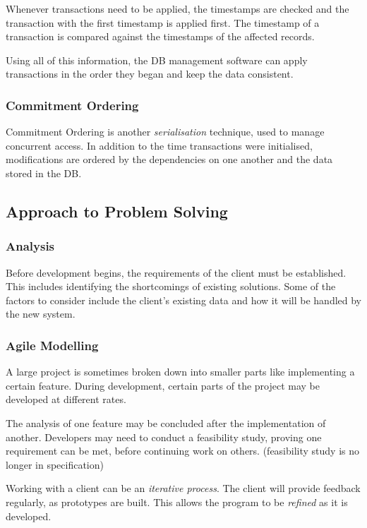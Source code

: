 \documentclass[9pt]{article}
\begin{document}
Whenever transactions need to be applied, the timestamps are checked and the transaction with the first timestamp is applied first. The timestamp of a transaction is compared against the timestamps of the affected records.

Using all of this information, the DB management software can apply transactions in the order they began and keep the data consistent.

\subsubsection{Commitment Ordering}
\label{sec:org93e1788}

Commitment Ordering is another \emph{serialisation} technique, used to manage concurrent access. In addition to the time transactions were initialised, modifications are ordered by the dependencies on one another and the data stored in the DB.

\subsection{Approach to Problem Solving}
\label{sec:org94f5f0a}
\subsubsection{Analysis}
\label{sec:org668d719}

Before development begins, the requirements of the client must be established. This includes identifying the shortcomings of existing solutions. Some of the factors to consider include the client's existing data and how it will be handled by the new system.

\subsubsection{Agile Modelling}
\label{sec:org2573260}

A large project is sometimes broken down into smaller parts like implementing a certain feature. During development, certain parts of the project may be developed at different rates.

The analysis of one feature may be concluded after the implementation of another. Developers may need to conduct a feasibility study, proving one requirement can be met, before continuing work on others. (feasibility study is no longer in specification)

Working with a client can be an \emph{iterative process}. The client will provide feedback regularly, as prototypes are built. This allows the program to be \emph{refined} as it is developed.
\end{document}
